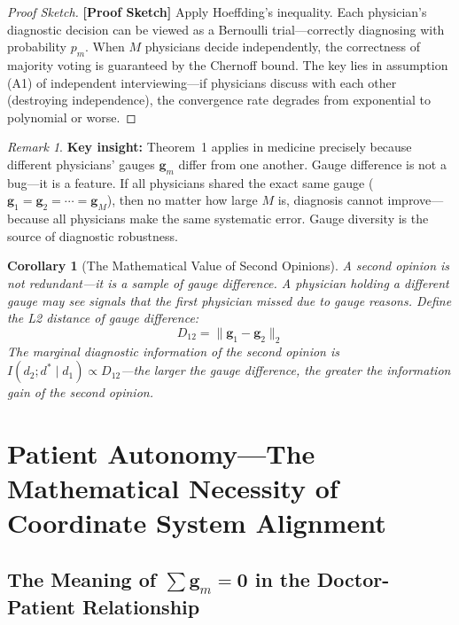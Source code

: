 \documentclass[12pt,a4paper]{article}
\newtheorem{corollary}[theorem]{Corollary}
\theoremstyle{remark}
\newtheorem{remark}[theorem]{Remark}
\newcommand{\rigorSketch}{\textnormal{\textbf{[Proof Sketch]}}}
\begin{document}
\begin{proof}[Proof Sketch]\rigorSketch
Apply Hoeffding's inequality. Each physician's diagnostic decision can be viewed as a Bernoulli trial---correctly diagnosing with probability $p_m$. When $M$ physicians decide independently, the correctness of majority voting is guaranteed by the Chernoff bound. The key lies in assumption (A1) of independent interviewing---if physicians discuss with each other (destroying independence), the convergence rate degrades from exponential to polynomial or worse.
\end{proof}

\begin{remark}
\textbf{Key insight:} Theorem~1 applies in medicine precisely because different physicians' gauges $\mathbf{g}_m$ differ from one another. Gauge difference is not a bug---it is a feature. If all physicians shared the exact same gauge ($\mathbf{g}_1 = \mathbf{g}_2 = \cdots = \mathbf{g}_M$), then no matter how large $M$ is, diagnosis cannot improve---because all physicians make the same systematic error. Gauge diversity is the source of diagnostic robustness.
\end{remark}

\begin{corollary}[The Mathematical Value of Second Opinions]\label{cor:second_opinion}
A second opinion is not redundant---it is a sample of gauge difference. A physician holding a different gauge may see signals that the first physician missed due to gauge reasons. Define the L2 distance of gauge difference:
\begin{equation}
    D_{12} = \|\mathbf{g}_1 - \mathbf{g}_2\|_2
\end{equation}
The marginal diagnostic information of the second opinion is $I(d_2 ; d^* \mid d_1) \propto D_{12}$---the larger the gauge difference, the greater the information gain of the second opinion.
\end{corollary}

\section{Patient Autonomy---The Mathematical Necessity of Coordinate System Alignment}
\label{sec:patient_autonomy}

\subsection{The Meaning of $\sum \mathbf{g}_m = \mathbf{0}$ in the Doctor-Patient Relationship}
\end{document}

